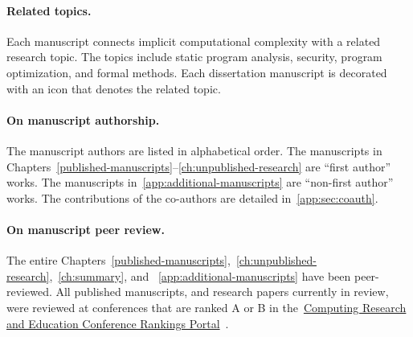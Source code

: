 \begin{description}
      
\end{description}

\paragraph*{Related topics.}
Each manuscript connects implicit computational complexity with a related
research topic. The topics include static program analysis, security, program
optimization, and formal methods. Each dissertation manuscript is decorated with
an icon that denotes the related topic.

\paragraph*{On manuscript authorship.}
The manuscript authors are listed in alphabetical order. The manuscripts in
Chapters~\ref{published-manuscripts}--\ref{ch:unpublished-research} are
\enquote{first author} works. The manuscripts
in~\autoref{app:additional-manuscripts} are \enquote{non-first author} works.
The contributions of the co-authors are detailed in~\autoref{app:sec:coauth}.

\paragraph*{On manuscript peer review.}
The entire
Chapters~\ref{published-manuscripts},~\ref{ch:unpublished-research},~\ref{ch:summary},
and ~\ref{app:additional-manuscripts} have been peer-reviewed. All published
manuscripts, and research papers currently in review, were reviewed at
conferences that are ranked A or B in
the~\href{https://portal.core.edu.au/conf-ranks/}{Computing Research and
Education Conference Rankings Portal}~\cite{core}.

